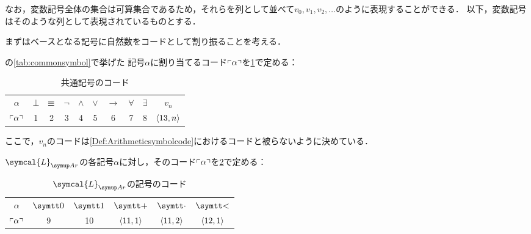 なお，変数記号全体の集合は可算集合であるため，それらを列として並べて\(v_0, v_1, v_2, \dots\)のように表現することができる．
以下，変数記号はそのような列として表現されているものとする．

まずはベースとなる記号に自然数をコードとして割り振ることを考える．

\begin{Def}[共通記号のコード] \label{Def:symbolGodelNumber}
	の\cref{tab:commonsymbol}で挙げた
	記号\(\alpha\)に割り当てるコード\(\mathopen{}\left\ulcorner \alpha \right\urcorner\mathclose{}\)を\cref{tab:symbolcode}で定める：

	\begin{table}[htbp]
		\centering
		\caption{共通記号のコード}
		\label{tab:symbolcode}
		\begin{tabular}{c|ccccccccc}
			\hline
			\(\alpha\)              & \(\bot\) & \(\equiv\) & \(\lnot\) & \(\land\) & \(\lor\) & \(\to\) & \(\forall\) & \(\exists\) & \(v_n\)                        \\
			\(\mathopen{}\left\ulcorner \alpha \right\urcorner\mathclose{}\) & 1        & 2          & 3         & 4         & 5        & 6       & 7           & 8           & \(\langle 13, n \rangle\) \\
			\hline
		\end{tabular}
	\end{table}

	ここで，\(v_n\)のコードは\cref{Def:Arithmeticsymbolcode}におけるコードと被らないように決めている．
\end{Def}

\begin{Def} \label{Def:Arithmeticsymbolcode}
	\(\symcal{L}_{\Ar}\)の各記号\(\alpha\)に対し，そのコード\(\mathopen{}\left\ulcorner \alpha \right\urcorner\mathclose{}\)を\cref{tab:Arithmeticsymbolcode}で定める：

	\begin{table}[htbp]
		\centering
		\caption{\(\symcal{L}_{\Ar}\)の記号のコード}
		\label{tab:Arithmeticsymbolcode}
		\begin{tabular}{c|ccccc}
			\hline
			\(\alpha\)              & \(\obj{0}\) & \(\obj{1}\) & \(\obj{+}\)                    & \(\obj{\cdot}\)                & \(\obj{<}\)                    \\
			\(\mathopen{}\left\ulcorner \alpha \right\urcorner\mathclose{}\) & 9           & 10          & \(\langle 11, 1 \rangle\) & \(\langle 11, 2 \rangle\) & \(\langle 12, 1 \rangle\) \\
			\hline
		\end{tabular}
	\end{table}
\end{Def}

